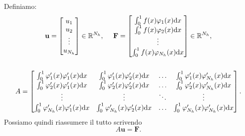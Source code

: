 \begin{enumerate}
Definiamo:
\begin{gather*}
\mathbf{u} =\begin{bmatrix}
u_{1}\\
u_{2}\\
\vdots \\
u_{N_{h}}
\end{bmatrix} \in \mathbb{R}^{N_{h}} ,\ \ \ \ \mathbf{F} =\begin{bmatrix}
\int ^{1}_{0} f(x) \varphi _{1}(x) \mathrm d x\\
\int ^{1}_{0} f(x) \varphi _{2}(x) \mathrm d x\\
\vdots \\
\int ^{1}_{0} f(x) \varphi _{N_{h}}(x) \mathrm d x
\end{bmatrix} \in \mathbb{R}^{N_{h}} ,\\\\
A=\begin{bmatrix}
\int ^{1}_{0} \varphi '_{1}(x) \varphi '_{1}(x) \mathrm d x & \int ^{1}_{0} \varphi '_{1}(x) \varphi '_{2}(x) \mathrm d x & \dotsc  & \int ^{1}_{0} \varphi '_{1}(x) \varphi '_{N_{h}}(x) \mathrm d x\\
\int ^{1}_{0} \varphi '_{2}(x) \varphi '_{1}(x) \mathrm d x & \int ^{1}_{0} \varphi '_{2}(x) \varphi '_{2}(x) \mathrm d x & \dotsc  & \int ^{1}_{0} \varphi '_{2}(x) \varphi '_{N_{h}}(x) \mathrm d x\\
\vdots  & \vdots  & \ddots  & \vdots \\
\int ^{1}_{0} \varphi '_{N_{h}}(x) \varphi '_{1}(x) \mathrm d x & \int ^{1}_{0} \varphi '_{N_{h}}(x) \varphi '_{2}(x) \mathrm d x & \dotsc  & \int ^{1}_{0} \varphi '_{N_{h}}(x) \varphi '_{N_{h}}(x) \mathrm d x
\end{bmatrix}.
\end{gather*}
Possiamo quindi riassumere il tutto scrivendo
\begin{equation}
	A\mathbf{u} =\mathbf{F}.
	\label{eq:Au-F}
\end{equation}
\end{enumerate}


